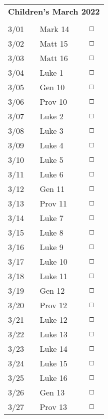 \documentclass[10pt,landscape,letterpaper]{article}
\begin{document}

\begin{multicols}{5}


\begin{tabular}{p{0.5in}p{0.65in}p{0.3in}}
\multicolumn{3}{c}{\textbf{Children's March 2022}} \\
     &       &             \\
3/01 & Mark 14 & $\boxempty$ \\
3/02 & Matt 15 & $\boxempty$ \\
3/03 & Matt 16 & $\boxempty$ \\
3/04 & Luke 1 & $\boxempty$ \\
\textcolor[rgb]{1.00,0.00,0.00}{3/05} & \textcolor[rgb]{1.00,0.00,0.00}{Gen 10} & $\boxempty$ \\
\textcolor[rgb]{1.00,0.00,0.00}{3/06} & \textcolor[rgb]{1.00,0.00,0.00}{Prov 10} & $\boxempty$ \\

3/07 & Luke 2 & $\boxempty$ \\
3/08 & Luke 3 & $\boxempty$ \\
3/09 & Luke 4 & $\boxempty$ \\
3/10 & Luke 5 & $\boxempty$ \\
3/11 & Luke 6 & $\boxempty$ \\
\textcolor[rgb]{1.00,0.00,0.00}{3/12} & \textcolor[rgb]{1.00,0.00,0.00}{Gen 11} & $\boxempty$ \\
\textcolor[rgb]{1.00,0.00,0.00}{3/13} & \textcolor[rgb]{1.00,0.00,0.00}{Prov 11} & $\boxempty$ \\

3/14 & Luke 7 & $\boxempty$ \\
3/15 & Luke 8 & $\boxempty$ \\
3/16 & Luke 9 & $\boxempty$ \\
3/17 & Luke 10 & $\boxempty$ \\
3/18 & Luke 11 & $\boxempty$ \\
\textcolor[rgb]{1.00,0.00,0.00}{3/19} & \textcolor[rgb]{1.00,0.00,0.00}{Gen 12} & $\boxempty$ \\
\textcolor[rgb]{1.00,0.00,0.00}{3/20} & \textcolor[rgb]{1.00,0.00,0.00}{Prov 12} & $\boxempty$ \\

3/21 & Luke 12 & $\boxempty$ \\
3/22 & Luke 13 & $\boxempty$ \\
3/23 & Luke 14 & $\boxempty$ \\
3/24 & Luke 15 & $\boxempty$ \\
3/25 & Luke 16 & $\boxempty$ \\
\textcolor[rgb]{1.00,0.00,0.00}{3/26} & \textcolor[rgb]{1.00,0.00,0.00}{Gen 13} & $\boxempty$ \\
\textcolor[rgb]{1.00,0.00,0.00}{3/27} & \textcolor[rgb]{1.00,0.00,0.00}{Prov 13} & $\boxempty$ \\


\end{tabular}
\end{multicols}
\end{document}
